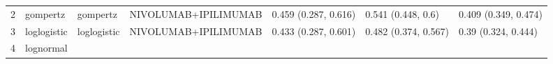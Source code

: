 \documentclass[
]{article}
\begin{document}
\begin{longtable}[]{@{}lllllll@{}}
\begin{minipage}[t]{0.02\columnwidth}
2\strut
\end{minipage} & \begin{minipage}[t]{0.09\columnwidth}\raggedright
gompertz\strut
\end{minipage} & \begin{minipage}[t]{0.09\columnwidth}\raggedright
gompertz\strut
\end{minipage} & \begin{minipage}[t]{0.15\columnwidth}\raggedright
NIVOLUMAB+IPILIMUMAB\strut
\end{minipage} & \begin{minipage}[t]{0.15\columnwidth}\raggedright
0.459 (0.287, 0.616)\strut
\end{minipage} & \begin{minipage}[t]{0.15\columnwidth}\raggedright
0.541 (0.448, 0.6)\strut
\end{minipage} & \begin{minipage}[t]{0.15\columnwidth}\raggedright
0.409 (0.349, 0.474)\strut
\end{minipage}\tabularnewline
\begin{minipage}[t]{0.02\columnwidth}\raggedright
3\strut
\end{minipage} & \begin{minipage}[t]{0.09\columnwidth}\raggedright
loglogistic\strut
\end{minipage} & \begin{minipage}[t]{0.09\columnwidth}\raggedright
loglogistic\strut
\end{minipage} & \begin{minipage}[t]{0.15\columnwidth}\raggedright
NIVOLUMAB+IPILIMUMAB\strut
\end{minipage} & \begin{minipage}[t]{0.15\columnwidth}\raggedright
0.433 (0.287, 0.601)\strut
\end{minipage} & \begin{minipage}[t]{0.15\columnwidth}\raggedright
0.482 (0.374, 0.567)\strut
\end{minipage} & \begin{minipage}[t]{0.15\columnwidth}\raggedright
0.39 (0.324, 0.444)\strut
\end{minipage}\tabularnewline
\begin{minipage}[t]{0.02\columnwidth}\raggedright
4\strut
\end{minipage} & \begin{minipage}[t]{0.09\columnwidth}\raggedright
lognormal\strut
\end{minipage} & \begin{minipage}[t]{0.09\columnwidth}\raggedright

\end{minipage}
\end{longtable}
\end{document}
